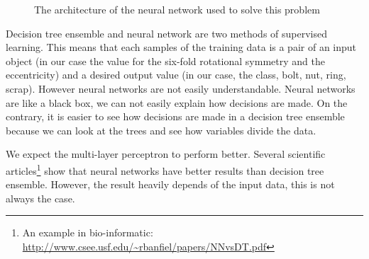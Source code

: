 \documentclass[]{article}
\begin{document}
\begin{figure}
\begin{neuralnetwork}[height=2.5, layertitleheight=0, nodespacing=2cm, layerspacing=2cm]
    \link[from layer=2, to layer=3, from node=2, to node=1]
    \link[from layer=2, to layer=3, from node=2, to node=2]
    \link[from layer=2, to layer=3, from node=2, to node=3]
    \link[from layer=2, to layer=3, from node=2, to node=4]

    \link[from layer=2, to layer=3, from node=3, to node=1]
    \link[from layer=2, to layer=3, from node=3, to node=2]
    \link[from layer=2, to layer=3, from node=3, to node=3]
    \link[from layer=2, to layer=3, from node=3, to node=4]

    
    \link[from layer=2, to layer=3, from node=4, to node=1]
    \link[from layer=2, to layer=3, from node=4, to node=2]
    \link[from layer=2, to layer=3, from node=4, to node=3]
    \link[from layer=2, to layer=3, from node=4, to node=4]
    
    \link[from layer=2, to layer=3, from node=5, to node=1]
    \link[from layer=2, to layer=3, from node=5, to node=2]
    \link[from layer=2, to layer=3, from node=5, to node=3]
    \link[from layer=2, to layer=3, from node=5, to node=4]
    
    \olayer[count=1, bias=false, text=\nodetextO]
    \link[from layer=3, to layer=4, from node=1, to node=1]
    \link[from layer=3, to layer=4, from node=2, to node=1]
    \link[from layer=3, to layer=4, from node=3, to node=1]
    \link[from layer=3, to layer=4, from node=4, to node=1]
  \end{neuralnetwork}
  
  \caption{The architecture of the neural network used to solve this problem}
  \label{fig:neural_network}
\end{figure}


Decision tree ensemble and neural network are two methods of supervised learning.
This means that each samples of the training data is a pair of an input object (in our case the value for the six-fold rotational symmetry and the eccentricity) and a desired output value (in our case, the class, bolt, nut, ring, scrap).
However neural networks are not easily understandable. Neural networks are like a black box, we can not easily explain how decisions are made. On the contrary, it is easier to see how decisions are made in a decision tree ensemble because we can look at the trees and see how variables divide the data.

\medskip

We expect the multi-layer perceptron to perform better. Several scientific articles\footnote{An example in bio-informatic: \url{http://www.csee.usf.edu/~rbanfiel/papers/NNvsDT.pdf}} show that neural networks have better results than decision tree ensemble. However, the result heavily depends of the input data, this is not always the case.
\end{document}
